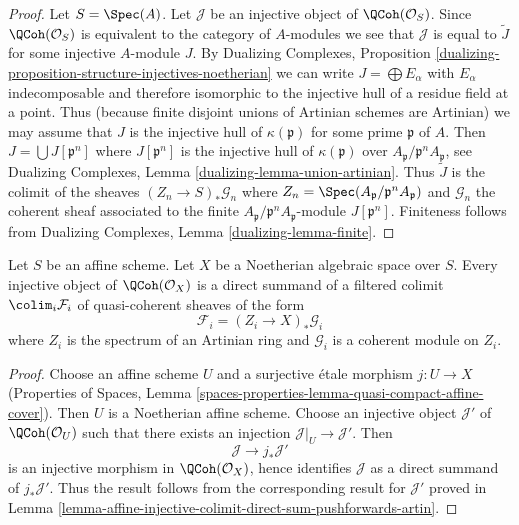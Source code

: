 \begin{proof}
Let $S = \Spec(A)$. Let $\mathcal{J}$ be an injective object of
$\QCoh(\mathcal{O}_S)$. Since $\QCoh(\mathcal{O}_S)$ is
equivalent to the category of $A$-modules we see that $\mathcal{J}$
is equal to $\widetilde{J}$ for some injective $A$-module $J$.
By Dualizing Complexes, Proposition
\ref{dualizing-proposition-structure-injectives-noetherian}
we can write $J = \bigoplus E_\alpha$ with $E_\alpha$ indecomposable
and therefore isomorphic to the injective hull of a residue field
at a point. Thus (because finite disjoint unions of Artinian schemes
are Artinian) we may assume that $J$ is the injective hull
of $\kappa(\mathfrak p)$ for some prime $\mathfrak p$ of $A$.
Then $J = \bigcup J[\mathfrak p^n]$ where $J[\mathfrak p^n]$ is
the injective hull of $\kappa(\mathfrak p)$ over
$A_\mathfrak p/\mathfrak p^nA_\mathfrak p$, see
Dualizing Complexes, Lemma \ref{dualizing-lemma-union-artinian}.
Thus $\widetilde{J}$ is the colimit of the sheaves
$(Z_n \to S)_*\mathcal{G}_n$ where
$Z_n = \Spec(A_\mathfrak p/\mathfrak p^nA_\mathfrak p)$ and
$\mathcal G_n$ the coherent sheaf associated to the
finite $A_\mathfrak p/\mathfrak p^nA_\mathfrak p$-module $J[\mathfrak p^n]$.
Finiteness follows from
Dualizing Complexes, Lemma \ref{dualizing-lemma-finite}.
\end{proof}

\begin{lemma}
\label{lemma-injective-colimit-direct-sum-pushforwards-artin}
Let $S$ be an affine scheme. Let $X$ be a Noetherian algebraic space
over $S$. Every injective object of $\QCoh(\mathcal{O}_X)$ is
a direct summand of a filtered colimit $\colim_i \mathcal{F}_i$
of quasi-coherent sheaves of the form
$$
\mathcal{F}_i = (Z_i \to X)_*\mathcal{G}_i
$$
where $Z_i$ is the spectrum of an Artinian ring and $\mathcal{G}_i$
is a coherent module on $Z_i$.
\end{lemma}

\begin{proof}
Choose an affine scheme $U$ and a surjective \'etale morphism
$j : U \to X$ (Properties of Spaces, Lemma
\ref{spaces-properties-lemma-quasi-compact-affine-cover}).
Then $U$ is a Noetherian affine scheme. Choose an injective object
$\mathcal{J}'$ of $\QCoh(\mathcal{O}_U)$ such that there
exists an injection $\mathcal{J}|_U \to \mathcal{J}'$. Then
$$
\mathcal{J} \to j_*\mathcal{J}'
$$
is an injective morphism in $\QCoh(\mathcal{O}_X)$,
hence identifies $\mathcal{J}$ as a direct summand of $j_*\mathcal{J}'$.
Thus the result follows from the corresponding result for
$\mathcal{J}'$ proved in
Lemma \ref{lemma-affine-injective-colimit-direct-sum-pushforwards-artin}.
\end{proof}

